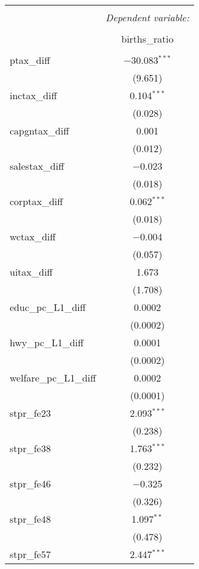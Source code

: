 
\begin{table}[!htbp] \centering 
  \caption{} 
  \label{} 
\begin{tabular}{@{\extracolsep{5pt}}lc} 
\\[-1.8ex]\hline 
\hline \\[-1.8ex] 
 & \multicolumn{1}{c}{\textit{Dependent variable:}} \\ 
\cline{2-2} 
\\[-1.8ex] & births\_ratio \\ 
\hline \\[-1.8ex] 
 ptax\_diff & $-$30.083$^{***}$ \\ 
  & (9.651) \\ 
  inctax\_diff & 0.104$^{***}$ \\ 
  & (0.028) \\ 
  capgntax\_diff & 0.001 \\ 
  & (0.012) \\ 
  salestax\_diff & $-$0.023 \\ 
  & (0.018) \\ 
  corptax\_diff & 0.062$^{***}$ \\ 
  & (0.018) \\ 
  wctax\_diff & $-$0.004 \\ 
  & (0.057) \\ 
  uitax\_diff & 1.673 \\ 
  & (1.708) \\ 
  educ\_pc\_L1\_diff & 0.0002 \\ 
  & (0.0002) \\ 
  hwy\_pc\_L1\_diff & 0.0001 \\ 
  & (0.0002) \\ 
  welfare\_pc\_L1\_diff & 0.0002 \\ 
  & (0.0001) \\ 
  stpr\_fe23 & 2.093$^{***}$ \\ 
  & (0.238) \\ 
  stpr\_fe38 & 1.763$^{***}$ \\ 
  & (0.232) \\ 
  stpr\_fe46 & $-$0.325 \\ 
  & (0.326) \\ 
  stpr\_fe48 & 1.097$^{**}$ \\ 
  & (0.478) \\ 
  stpr\_fe57 & 2.447$^{***}$ \\ 

\end{tabular}
\end{table}
